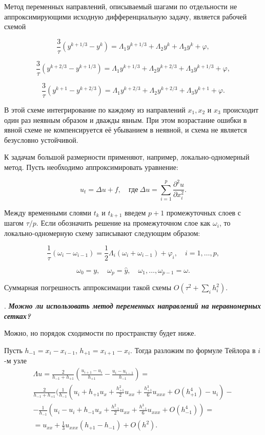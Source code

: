 \documentclass[12pt, a4paper]{article}
\newcounter{mycounter}
\newcommand{\quastion}[1]{%
	\stepcounter{mycounter}%
	\textbf{\themycounter}.  %
	\textbf{\textit{#1}}
	
}
\begin{document}
	
		
		Метод переменных направлений, описываемый шагами по отдельности не аппроксимирующими исходную дифференциальную задачу, является рабочей схемой
		
		\[
		\frac{3}{\tau}(y^{k+1/3} - y^k) = \Lambda_1 y^{k+1/3} + \Lambda_2 y^{k} + \Lambda_3 y^{k} + \varphi,
		\]
		
		\[
		\frac{3}{\tau}(y^{k+2/3} - y^{k+1/3}) = \Lambda_1 y^{k+1/3} + \Lambda_2 y^{k+2/3} + \Lambda_3 y^{k+1/3} + \varphi,
		\]
		
		\[
		\frac{3}{\tau}(y^{k+1} - y^{k+2/3}) = \Lambda_1 y^{k+2/3} + \Lambda_2 y^{k+2/3} + \Lambda_3 y^{k+1} + \varphi.
		\]
		
		В этой схеме интегрирование по каждому из направлений $x_1, x_2$ и $x_3$ происходит один раз неявным образом и дважды явным. При этом возрастание ошибки в явной схеме не компенсируется её убыванием в неявной, и схема не является безусловно устойчивой.
		
		К задачам большой размерности применяют, например, локально-одномерный метод. Пусть необходимо аппроксимировать уравнение:
		
		\[
		u_t = \Delta u + f, \quad \text{где} \ \Delta u = \sum_{i=1}^p \frac{\partial^2 u}{\partial x_i^2}.
		\]
		
		Между временными слоями $t_k$ и $t_{k+1}$ введем $p+1$ промежуточных слоев с шагом $\tau / p$. Если обозначить решение на промежуточном слое как $\omega_i$, то локально-одномерную схему записывают следующим образом:
		
		\[
		\frac{1}{\tau} (\omega_i - \omega_{i-1}) = \frac{1}{2} \Lambda_i (\omega_i + \omega_{i-1}) + \varphi_i, \quad i = 1, \ldots, p,
		\]
		
		\[
		\omega_0 = y, \quad \omega_p = \hat{y}, \quad \omega_1, \ldots, \omega_{p-1} = \omega.
		\]
		
		Суммарная погрешность аппроксимации такой схемы $O(\tau^2 + \sum_i h_i^2)$.
	
	
	\bigskip
	
	\quastion{Можно ли использовать метод переменных направлений
	на неравномерных сетках?}
	
	Можно, но порядок сходимости по пространству будет ниже. 
	
	Пусть $h_{-1} = x_i - x_{i-1}$, $h_{+1} = x_{i+1} - x_i$. Тогда разложим по формуле Тейлора в $i$-м узле
	\begin{multline*}
		 \Lambda u = \frac{2}{h_{-1} + h_{+1}} (\frac{u_{i+1} - u_i}{h_{+1}} - \frac{u_{i} - u_{i-1}}{h_{-1}}) = \\
		  \frac{2}{h_{-1} + h_{+1}} (\frac{1}{h_{-1}} (u_i + h_{+1} u_x + \frac{h^2_{+1}}{2} u_{xx} + \frac{h^3_{+1}}{6} u_{xxx} + O(h^4_{+1}) - u_i) - \\
		 - \frac{1}{h_{-1}} (u_i - u_i + h_{-1} u_x + \frac{h^2_{-1}}{2} u_{xx} + \frac{h^3_{-1}}{6} u_{xxx} + O(h^4_{-1})) = \\
		 = u_{xx} + \frac{1}{3}u_{xxx}(h_{+1}-h_{-1}) + O(h^2).
	\end{multline*}
	
\end{document}
